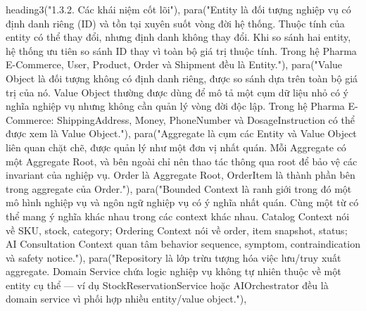   heading3("1.3.2. Các khái niệm cốt lõi"),
  para("Entity là đối tượng nghiệp vụ có định danh riêng (ID) và tồn tại xuyên suốt vòng đời hệ thống. Thuộc tính của entity có thể thay đổi, nhưng định danh không thay đổi. Khi so sánh hai entity, hệ thống ưu tiên so sánh ID thay vì toàn bộ giá trị thuộc tính. Trong hệ Pharma E-Commerce, User, Product, Order và Shipment đều là Entity."),
  para("Value Object là đối tượng không có định danh riêng, được so sánh dựa trên toàn bộ giá trị của nó. Value Object thường được dùng để mô tả một cụm dữ liệu nhỏ có ý nghĩa nghiệp vụ nhưng không cần quản lý vòng đời độc lập. Trong hệ Pharma E-Commerce: ShippingAddress, Money, PhoneNumber và DosageInstruction có thể được xem là Value Object."),
  para("Aggregate là cụm các Entity và Value Object liên quan chặt chẽ, được quản lý như một đơn vị nhất quán. Mỗi Aggregate có một Aggregate Root, và bên ngoài chỉ nên thao tác thông qua root để bảo vệ các invariant của nghiệp vụ. Order là Aggregate Root, OrderItem là thành phần bên trong aggregate của Order."),
  para("Bounded Context là ranh giới trong đó một mô hình nghiệp vụ và ngôn ngữ nghiệp vụ có ý nghĩa nhất quán. Cùng một từ có thể mang ý nghĩa khác nhau trong các context khác nhau. Catalog Context nói về SKU, stock, category; Ordering Context nói về order, item snapshot, status; AI Consultation Context quan tâm behavior sequence, symptom, contraindication và safety notice."),
  para("Repository là lớp trừu tượng hóa việc lưu/truy xuất aggregate. Domain Service chứa logic nghiệp vụ không tự nhiên thuộc về một entity cụ thể — ví dụ StockReservationService hoặc AIOrchestrator đều là domain service vì phối hợp nhiều entity/value object."),

